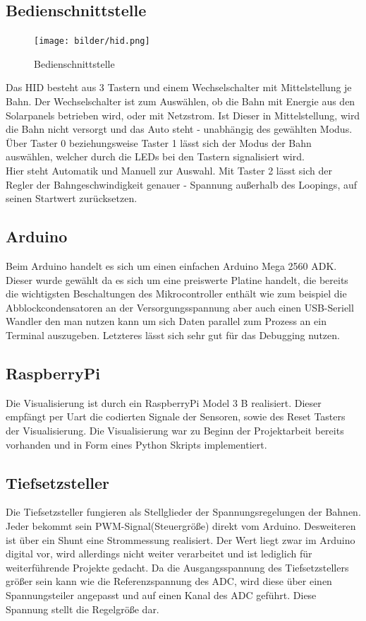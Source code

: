 \documentclass[a4paper, 11pt]{scrartcl}
\begin{document}
	\subsection{Bedienschnittstelle}
		\begin{figure}[h]
			\centering
			\texttt{[image: bilder/hid.png]}
			\caption{Bedienschnittstelle}
			\label{img:hid}
		\end{figure}
		Das HID besteht aus 3 Tastern und einem Wechselschalter mit Mittelstellung je Bahn.
		Der Wechselschalter ist zum Auswählen, ob die Bahn mit Energie aus den Solarpanels betrieben wird, oder mit Netzstrom. Ist Dieser in Mittelstellung, wird die Bahn nicht versorgt und das Auto steht - unabhängig des gewählten Modus.
		Über Taster 0 beziehungsweise Taster 1 lässt sich der Modus der Bahn auswählen, welcher durch die LEDs bei den Tastern signalisiert wird. \\Hier steht Automatik und Manuell zur Auswahl.
		Mit Taster 2 lässt sich der Regler der Bahngeschwindigkeit genauer -  Spannung außerhalb des Loopings, auf seinen Startwert zurücksetzen.
	\subsection{Arduino}
		Beim Arduino handelt es sich um einen einfachen Arduino Mega 2560 ADK.\\
		Dieser wurde gewählt da es sich um eine preiswerte Platine handelt, die bereits die wichtigsten Beschaltungen des Mikrocontroller enthält wie zum beispiel die Abblockcondensatoren an der Versorgungsspannung aber auch einen USB-Seriell Wandler den man nutzen kann um sich Daten parallel zum Prozess an ein Terminal auszugeben.
		Letzteres lässt sich sehr gut für das Debugging nutzen.
	\subsection{RaspberryPi}
		Die Visualisierung ist durch ein RaspberryPi Model 3 B realisiert. Dieser empfängt per Uart die codierten Signale der Sensoren, sowie des Reset Tasters der Visualisierung.
		Die Visualisierung war zu Beginn der Projektarbeit bereits vorhanden und in Form eines Python Skripts implementiert.
	\subsection{Tiefsetzsteller}
		Die Tiefsetzsteller fungieren als Stellglieder der Spannungsregelungen der Bahnen. 
		Jeder bekommt sein PWM-Signal(Steuergröße) direkt vom Arduino. Desweiteren ist über ein Shunt eine 
		Strommessung realisiert. Der Wert liegt zwar im Arduino digital vor, wird allerdings nicht weiter 
		verarbeitet und ist lediglich für weiterführende Projekte gedacht. Da die Ausgangsspannung des 
		Tiefsetzstellers größer sein kann wie die Referenzspannung des ADC, 
		wird diese über einen Spannungsteiler angepasst und auf einen Kanal des ADC geführt. 
		Diese Spannung stellt die Regelgröße dar.
	\newpage
\end{document}

